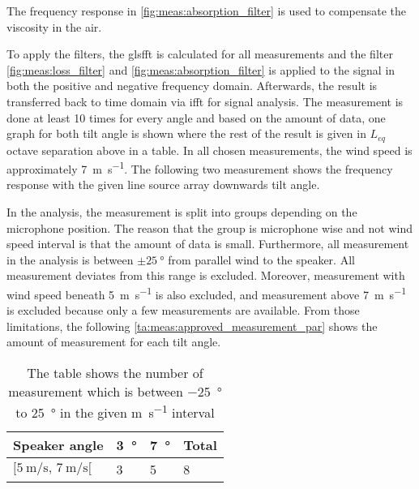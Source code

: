   
 
The frequency response in \autoref{fig:meas:absorption_filter} is used to compensate the viscosity in the air. 

To apply the filters, the gls{fft} is calculated for all measurements and the filter  \autoref{fig:meas:loss_filter} and \autoref{fig:meas:absorption_filter} is applied to the signal in both the positive and negative frequency domain. Afterwards, the result is transferred back to time domain via \gls{ifft} for signal analysis.  The measurement is done at least 10 times for every angle and based on the amount of data, one graph for both tilt angle is shown where the rest of the result is given in $L_{eq}$ octave separation above  in a table. In all chosen measurements, the wind speed is approximately \SI{7}{\meter\per\second}. The following two measurement shows the frequency response with the given line source array downwards tilt angle. 
   

In the analysis, the measurement is split into groups depending on the microphone position. The reason that the group is microphone wise and not wind speed interval is that the amount of data is small. Furthermore, all measurement in the analysis is between $\pm\SI{25}{\degree}$ from parallel wind to the speaker.  All measurement deviates from this range is excluded. Moreover, measurement with wind speed beneath \SI{5}{\meter\per\second} is also excluded, and measurement above \SI{7}{\meter\per\second} is excluded because only a few measurements are available.  From those limitations, the following \autoref{ta:meas:approved_measurement_par} shows the amount of measurement for each tilt angle. 

\begin{table}[H]
\centering
\caption{The table shows the number of measurement which is between \SI{-25}{\degree} to \SI{25}{\degree} in the given \si{\meter\per\second} interval}
\begin{tabular}{l|l|l|l}
Speaker angle & \SI{3}{\degree}  & \SI{7}{\degree} & Total \\ \hline
$[\SI{5}{\meter\per\second},\, \SI{7}{\meter\per\second}[  $        & 3  & 5  & 8     \\      
\end{tabular}
\label{ta:meas:approved_measurement_par}
\end{table}

